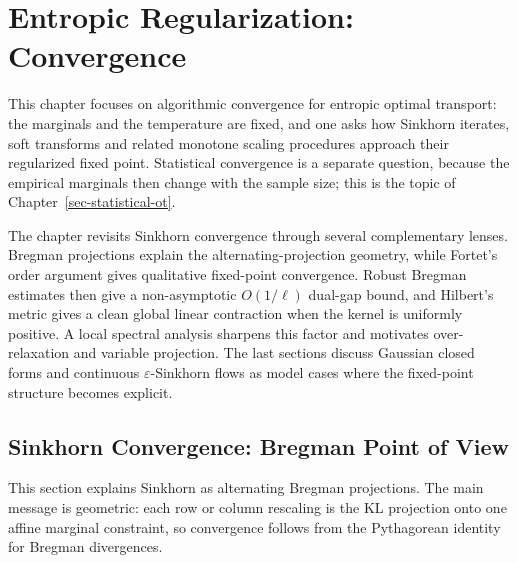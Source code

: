 
\chapter{Entropic Regularization: Convergence}
\label{sec-sinkhorn-advanced}
\label{sec-entropic-convergence}
\label{sec-convergence-dual}

This chapter focuses on algorithmic convergence for entropic optimal transport: the marginals and the temperature are fixed, and one asks how Sinkhorn iterates, soft transforms and related monotone scaling procedures approach their regularized fixed point. Statistical convergence is a separate question, because the empirical marginals then change with the sample size; this is the topic of Chapter~\ref{sec-statistical-ot}.

The chapter revisits Sinkhorn convergence through several complementary lenses. Bregman projections explain the alternating-projection geometry, while Fortet's order argument gives qualitative fixed-point convergence. Robust Bregman estimates then give a non-asymptotic $O(1/\ell)$ dual-gap bound, and Hilbert's metric gives a clean global linear contraction when the kernel is uniformly positive. A local spectral analysis sharpens this factor and motivates over-relaxation and variable projection. The last sections discuss Gaussian closed forms and continuous \(\varepsilon\)-Sinkhorn flows as model cases where the fixed-point structure becomes explicit.

\section{Sinkhorn Convergence: Bregman Point of View}
\label{sec-convergence-init}

This section explains Sinkhorn as alternating Bregman projections. The main message is geometric: each row or column rescaling is the KL projection onto one affine marginal constraint, so convergence follows from the Pythagorean identity for Bregman divergences.

